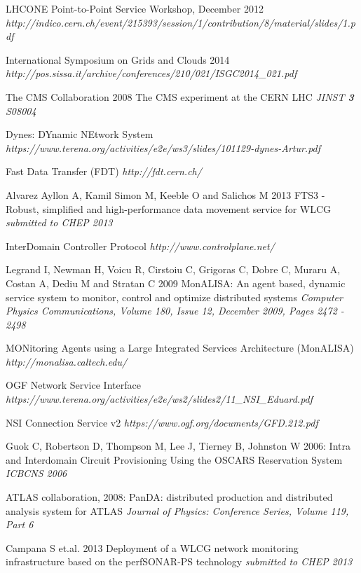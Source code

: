 \begin{thebibliography}{1}

 LHCONE Point-to-Point Service Workshop, December 2012 
 {\it http://indico.cern.ch/event/215393/session/1/contribution/8/material/slides/1.pdf}
 
International Symposium on Grids and Clouds 2014 {\it http://pos.sissa.it/archive/conferences/210/021/ISGC2014\_021.pdf}

 The CMS Collaboration 2008 The CMS experiment at the CERN LHC {\it JINST {\bf 3} S08004}

 Dynes: DYnamic NEtwork System {\it https://www.terena.org/activities/e2e/ws3/slides/101129-dynes-Artur.pdf}

 Fast Data Transfer (FDT) {\it http://fdt.cern.ch/}
 
 Alvarez Ayllon A, Kamil Simon M, Keeble O and Salichos M 2013 FTS3 - Robust, simplified and high-performance data movement service for WLCG {\it submitted to CHEP 2013}

 InterDomain Controller Protocol {\it http://www.controlplane.net/}
 
 Legrand I, Newman H, Voicu R, Cirstoiu C, Grigoras C, Dobre C, Muraru A, Costan A, Dediu M and Stratan C 2009 MonALISA: An agent based, dynamic service system to monitor, control and optimize distributed systems {\it Computer Physics Communications, Volume 180, Issue 12, December 2009, Pages 2472 - 2498}

 MONitoring Agents using a Large Integrated Services Architecture (MonALISA) {\it http://monalisa.caltech.edu/}

 OGF Network Service Interface {\it https://www.terena.org/activities/e2e/ws2/slides2/11\_NSI\_Eduard.pdf}
 
 NSI Connection Service v2 {\it https://www.ogf.org/documents/GFD.212.pdf}

  Guok C, Robertson D, Thompson M, Lee J, Tierney B, Johnston W 2006: Intra and Interdomain Circuit Provisioning Using the OSCARS Reservation System {\it ICBCNS 2006}
  
  ATLAS collaboration, 2008: PanDA: distributed production and distributed analysis system for ATLAS {\it Journal of Physics: Conference Series, Volume 119, Part 6}
  
  Campana S et.al. 2013 Deployment of a WLCG network monitoring infrastructure based on the perfSONAR-PS technology {\it submitted to CHEP 2013}


\end{thebibliography}
